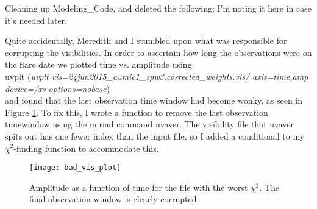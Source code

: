 \documentclass[a4paper]{tufte-handout}
\begin{document}
Cleaning up Modeling\_Code, and deleted the following;
I'm noting it here in case it's needed later.\\


\hrulefill


Quite accidentally, Meredith and I stumbled upon what was responsible for corrupting the visibilities. In order to ascertain how long the observations were on the flare date we plotted time vs. amplitude using\\
uvplt (\textit{uvplt vis=24jun2015\_aumic1\_spw3.corrected\_weights.vis/ axis=time,amp device=/xs options=nobase})\\
and found that the last observation time window had become wonky, as seen in Figure \ref{fig:bad_vis}. To fix this, I wrote a function to remove the last observation timewindow using the miriad command uvaver. The visibility file that uvaver spits out has one fewer index than the input file, so I added a conditional to my $\chi^2$-finding function to accommodate this.

\begin{figure}[!ht]
	\label{fig:bad_vis}
	\centering
	\caption{Amplitude as a function of time for the file with the worst $\chi^2$. The final observation window is clearly corrupted.}

	\texttt{[image: bad\_vis\_plot]}
\end{figure}


\hrulefill

\end{document}
